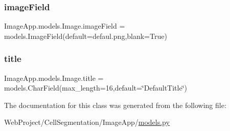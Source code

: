 \mbox{\label{class_image_app_1_1models_1_1_image_a51e14dc1cb0478dd234a0ed900dd97f7}} 
\subsubsection{\texorpdfstring{image\+Field}{imageField}}
{\footnotesize\ttfamily Image\+App.\+models.\+Image.\+image\+Field = models.\+Image\+Field(default=\textquotesingle{}defaul.\+png\textquotesingle{},blank=True)\hspace{0.3cm}{\ttfamily [static]}}

\mbox{\label{class_image_app_1_1models_1_1_image_a22b593efe01ca4fd50122621459c4d0e}} 
\subsubsection{\texorpdfstring{title}{title}}
{\footnotesize\ttfamily Image\+App.\+models.\+Image.\+title = models.\+Char\+Field(max\+\_\+length=16,default=\char`\"{}Default\+Title\char`\"{})\hspace{0.3cm}{\ttfamily [static]}}



The documentation for this class was generated from the following file\+:\begin{DoxyCompactItemize}
\item 
Web\+Project/\+Cell\+Segmentation/\+Image\+App/\mbox{\hyperlink{models_8py}{models.\+py}}\end{DoxyCompactItemize}
